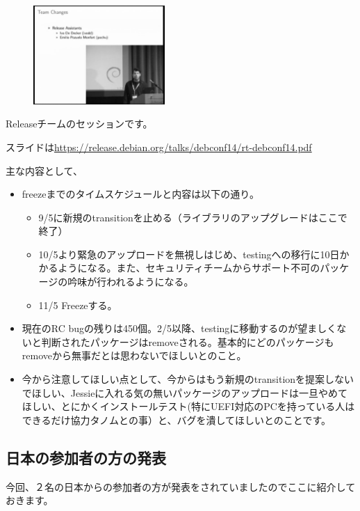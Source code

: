 \documentclass[mingoth,a4paper]{jsarticle}
\begin{document}
\begin{figure}
  \includegraphics[width=5cm]{image201409/jessie_release_mono.png}
\end{figure}

 Releaseチームのセッションです。

 スライドは\url{https://release.debian.org/talks/debconf14/rt-debconf14.pdf}

 主な内容として、

\begin{itemize}
  \item freezeまでのタイムスケジュールと内容は以下の通り。
    \begin{itemize}
    \item 9/5に新規のtransitionを止める（ライブラリのアップグレードはここで終了）
    \item 10/5より緊急のアップロードを無視しはじめ、testingへの移行に10日かかるようになる。また、セキュリティチームからサポート不可のパッケージの吟味が行われるようになる。
    \item 11/5 Freezeする。
    \end{itemize}
\end{itemize}

\begin{itemize}
  \item 現在のRC bugの残りは450個。2/5以降、testingに移動するのが望ましくないと判断されたパッケージはremoveされる。基本的にどのパッケージもremoveから無事だとは思わないでほしいとのこと。
  \item 今から注意してほしい点として、今からはもう新規のtransitionを提案しないでほしい、Jessieに入れる気の無いパッケージのアップロードは一旦やめてほしい、とにかくインストールテスト(特にUEFI対応のPCを持っている人はできるだけ協力タノムとの事）と、バグを潰してほしいとのことです。
\end{itemize}

\subsection{日本の参加者の方の発表}

 今回、２名の日本からの参加者の方が発表をされていましたのでここに紹介しておきます。
\end{document}
